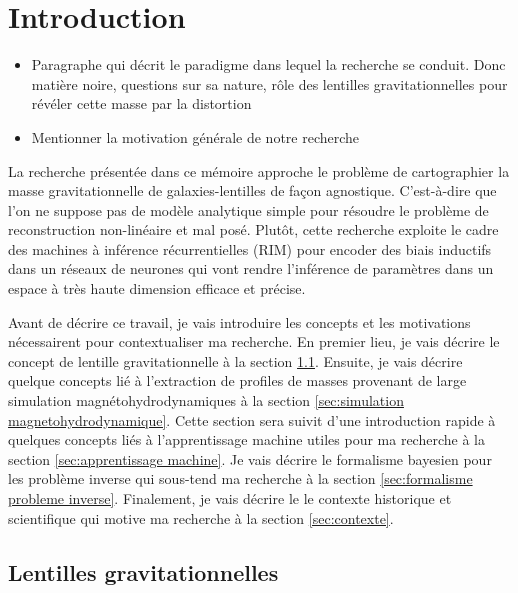 \chapter{Introduction}
\thispagestyle{empty}
\begin{itemize}
        \item Paragraphe qui décrit le paradigme dans lequel la recherche se conduit. 
                Donc matière noire, questions sur sa nature, rôle des 
                lentilles gravitationnelles pour révéler cette masse par la distortion
        \item Mentionner la motivation générale de notre recherche
\end{itemize}

La recherche présentée dans ce mémoire approche le problème de cartographier la 
masse gravitationnelle de galaxies-lentilles de façon agnostique. C'est-à-dire que 
l'on ne suppose pas de modèle analytique simple pour résoudre le problème 
de reconstruction non-linéaire et mal posé. Plutôt, cette recherche exploite 
le cadre des machines à inférence récurrentielles (RIM) pour encoder des biais 
inductifs dans un réseaux de neurones qui vont rendre l'inférence de 
paramètres dans un espace à très haute dimension efficace et précise.

Avant de décrire ce travail, je vais introduire les concepts 
et les motivations nécessairent pour contextualiser ma recherche.
En premier lieu, je vais décrire le concept de lentille 
gravitationnelle à la section \ref{sec:lentilles gravitationnelles}. Ensuite, 
je vais décrire quelque concepts lié à l'extraction de profiles de masses 
provenant de large simulation magnétohydrodynamiques à la section 
\ref{sec:simulation magnetohydrodynamique}. 
Cette section sera suivit d'une introduction rapide à quelques concepts liés 
à l'apprentissage machine utiles pour ma recherche
à la section \ref{sec:apprentissage machine}. 
Je vais décrire le formalisme bayesien pour les problème inverse 
qui sous-tend ma recherche à la section \ref{sec:formalisme probleme inverse}.
Finalement, je vais décrire le 
le contexte historique et scientifique qui motive ma recherche 
à la section \ref{sec:contexte}.
\citep{Morningstar2019}

\section{Lentilles gravitationnelles}\label{sec:lentilles gravitationnelles}

